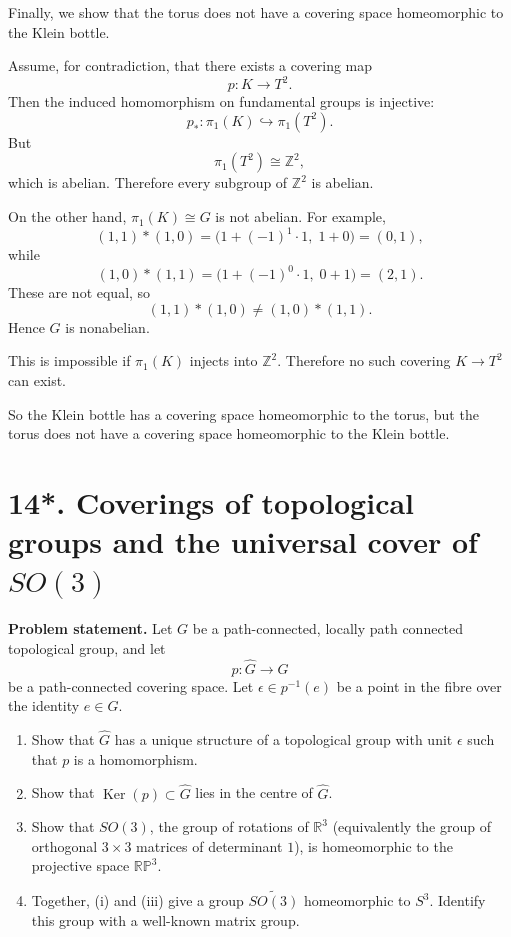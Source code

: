 \documentclass[12pt,a4paper]{article}
\theoremstyle{notespace}
\DeclareMathOperator{\Ker}{Ker}
\begin{document}
\medskip

Finally, we show that the torus does not have a covering space homeomorphic to the Klein bottle.

Assume, for contradiction, that there exists a covering map
\[
p:K\to T^2.
\]
Then the induced homomorphism on fundamental groups is injective:
\[
p_*:\pi_1(K)\hookrightarrow \pi_1(T^2).
\]
But
\[
\pi_1(T^2)\cong \mathbb Z^2,
\]
which is abelian. Therefore every subgroup of \(\mathbb Z^2\) is abelian.

On the other hand, \(\pi_1(K)\cong G\) is not abelian. For example,
\[
(1,1)*(1,0)=\bigl(1+(-1)^1\cdot 1,\;1+0\bigr)=(0,1),
\]
while
\[
(1,0)*(1,1)=\bigl(1+(-1)^0\cdot 1,\;0+1\bigr)=(2,1).
\]
These are not equal, so
\[
(1,1)*(1,0)\neq (1,0)*(1,1).
\]
Hence \(G\) is nonabelian.

This is impossible if \(\pi_1(K)\) injects into \(\mathbb Z^2\). Therefore no such covering \(K\to T^2\) can exist.

So the Klein bottle has a covering space homeomorphic to the torus, but the torus does not have a covering space homeomorphic to the Klein bottle.



\section{14*. Coverings of topological groups and the universal cover of \(SO(3)\)}

\textbf{Problem statement.} Let \(G\) be a path-connected, locally path connected topological group, and let
\[
p:\widehat{G}\to G
\]
be a path-connected covering space. Let \(\epsilon\in p^{-1}(e)\) be a point in the fibre over the identity \(e\in G\).

\begin{enumerate}
	\item[(i)] Show that \(\widehat{G}\) has a unique structure of a topological group with unit \(\epsilon\) such that \(p\) is a homomorphism.
	\item[(ii)] Show that \(\Ker(p)\subset \widehat{G}\) lies in the centre of \(\widehat{G}\).
	\item[(iii)] Show that \(SO(3)\), the group of rotations of \(\mathbb R^3\) (equivalently the group of orthogonal \(3\times 3\) matrices of determinant \(1\)), is homeomorphic to the projective space \(\mathbb{RP}^3\).
	\item[(iv)] Together, (i) and (iii) give a group \(\widetilde{SO(3)}\) homeomorphic to \(S^3\). Identify this group with a well-known matrix group.
\end{enumerate}
\end{document}
